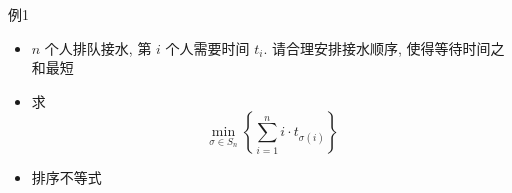 \begin{frame}[fragile]{例1}
	\begin{itemize}
		\item<1-> \(n\) 个人排队接水, 第 \(i\) 个人需要时间 \(t_i\). 请合理安排接水顺序, 使得等待时间之和最短
		\item<2-> 求
			\[
				\min_{\sigma\in S_n}\left\{\sum_{i=1}^n i\cdot t_{\sigma(i)}\right\}
			\]
		\item<3-> 排序不等式
	\end{itemize}
\end{frame}

